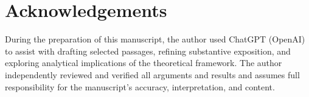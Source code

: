\section*{Acknowledgements}

During the preparation of this manuscript, the author used ChatGPT (OpenAI) to assist with drafting selected passages, refining substantive exposition, and exploring analytical implications of the theoretical framework. The author independently reviewed and verified all arguments and results and assumes full responsibility for the manuscript's accuracy, interpretation, and content.
